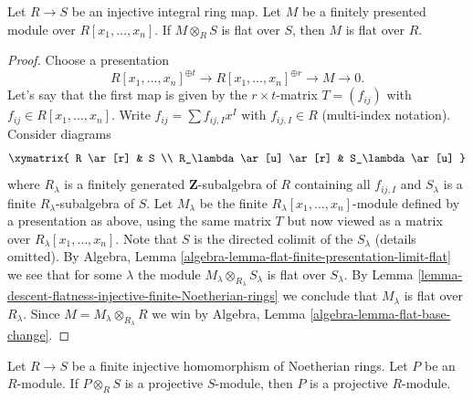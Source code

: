 \begin{lemma}
\label{lemma-descent-flatness-injective-integral}
Let $R \to S$ be an injective integral ring map.
Let $M$ be a finitely presented module over $R[x_1, \ldots, x_n]$.
If $M \otimes_R S$ is flat over $S$, then $M$ is flat over $R$.
\end{lemma}

\begin{proof}
Choose a presentation
$$
R[x_1, \ldots, x_n]^{\oplus t} \to R[x_1, \ldots, x_n]^{\oplus r} \to M \to 0.
$$
Let's say that the first map is given by the $r \times t$-matrix
$T = (f_{ij})$ with $f_{ij} \in R[x_1, \ldots, x_n]$. Write
$f_{ij} = \sum f_{ij, I} x^I$ with $f_{ij, I} \in R$ (multi-index notation).
Consider diagrams
$$
\xymatrix{
R \ar[r] & S \\
R_\lambda \ar[u] \ar[r] & S_\lambda \ar[u]
}
$$
where $R_\lambda$ is a finitely generated $\mathbf{Z}$-subalgebra of
$R$ containing all $f_{ij, I}$ and $S_\lambda$ is a finite
$R_\lambda$-subalgebra of $S$. Let $M_\lambda$ be the finite
$R_\lambda[x_1, \ldots, x_n]$-module defined by a presentation
as above, using the same matrix $T$ but now viewed as a matrix
over $R_\lambda[x_1, \ldots, x_n]$. Note that $S$ is the directed colimit
of the $S_\lambda$ (details omitted). By
Algebra, Lemma \ref{algebra-lemma-flat-finite-presentation-limit-flat}
we see that for some $\lambda$ the module
$M_\lambda \otimes_{R_\lambda} S_\lambda$ is flat over $S_\lambda$. By
Lemma \ref{lemma-descent-flatness-injective-finite-Noetherian-rings}
we conclude that $M_\lambda$ is flat over $R_\lambda$. Since
$M = M_\lambda \otimes_{R_\lambda} R$ we win by
Algebra, Lemma \ref{algebra-lemma-flat-base-change}.
\end{proof}

\begin{lemma}
\label{lemma-descent-projective-injective-finite-Noetherian-rings}
Let $R \to S$ be a finite injective homomorphism of Noetherian rings.
Let $P$ be an $R$-module. If $P \otimes_R S$ is a projective $S$-module,
then $P$ is a projective $R$-module.
\end{lemma}

